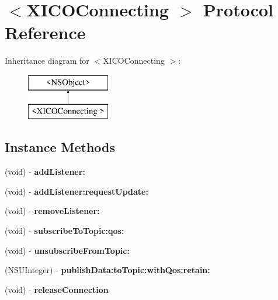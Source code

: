 \hypertarget{protocol_x_i_c_o_connecting_01-p}{}\section{$<$X\+I\+C\+O\+Connecting $>$ Protocol Reference}
\label{protocol_x_i_c_o_connecting_01-p}
Inheritance diagram for $<$X\+I\+C\+O\+Connecting $>$\+:\begin{figure}[H]
\begin{center}
\leavevmode
\includegraphics[height=2.000000cm]{protocol_x_i_c_o_connecting_01-p}
\end{center}
\end{figure}
\subsection*{Instance Methods}
\begin{DoxyCompactItemize}
\item 
\hypertarget{protocol_x_i_c_o_connecting_01-p_a22ec4956721e831214782af7089273e2}{}\label{protocol_x_i_c_o_connecting_01-p_a22ec4956721e831214782af7089273e2} 
(void) -\/ {\bfseries add\+Listener\+:}
\item 
\hypertarget{protocol_x_i_c_o_connecting_01-p_ac76162ed1b397462bc3f65f53f7974cc}{}\label{protocol_x_i_c_o_connecting_01-p_ac76162ed1b397462bc3f65f53f7974cc} 
(void) -\/ {\bfseries add\+Listener\+:request\+Update\+:}
\item 
\hypertarget{protocol_x_i_c_o_connecting_01-p_a65ed2b0441a536b9ef3d99f16d46edd4}{}\label{protocol_x_i_c_o_connecting_01-p_a65ed2b0441a536b9ef3d99f16d46edd4} 
(void) -\/ {\bfseries remove\+Listener\+:}
\item 
\hypertarget{protocol_x_i_c_o_connecting_01-p_af045bbe312e8d5a5e8ac79826880f5ea}{}\label{protocol_x_i_c_o_connecting_01-p_af045bbe312e8d5a5e8ac79826880f5ea} 
(void) -\/ {\bfseries subscribe\+To\+Topic\+:qos\+:}
\item 
\hypertarget{protocol_x_i_c_o_connecting_01-p_a32177ba64f9699843a0fbe64c5593ac7}{}\label{protocol_x_i_c_o_connecting_01-p_a32177ba64f9699843a0fbe64c5593ac7} 
(void) -\/ {\bfseries unsubscribe\+From\+Topic\+:}
\item 
\hypertarget{protocol_x_i_c_o_connecting_01-p_a40cb7771f4c67accdbb4d9822760acb4}{}\label{protocol_x_i_c_o_connecting_01-p_a40cb7771f4c67accdbb4d9822760acb4} 
(N\+S\+U\+Integer) -\/ {\bfseries publish\+Data\+:to\+Topic\+:with\+Qos\+:retain\+:}
\item 
\hypertarget{protocol_x_i_c_o_connecting_01-p_a1481752cd202c4cca52761d009004646}{}\label{protocol_x_i_c_o_connecting_01-p_a1481752cd202c4cca52761d009004646} 
(void) -\/ {\bfseries release\+Connection}
\end{DoxyCompactItemize}
